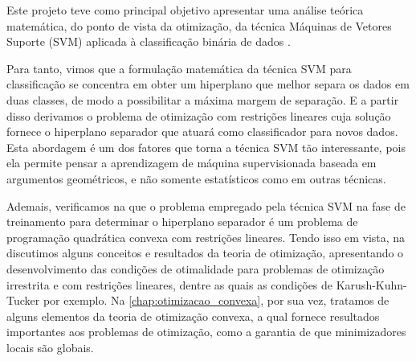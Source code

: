 \documentclass[12pt,a4paper]{scrartcl}
\theoremstyle{definition}%
\begin{document}
Este projeto teve como principal objetivo apresentar uma análise teórica matemática, do ponto de vista da otimização, da técnica Máquinas de Vetores Suporte (SVM) aplicada à classificação binária de dados \cite{Evelin2017,Faisal2019}. 




Para tanto, vimos que a formulação matemática da técnica SVM para classificação se concentra em obter um hiperplano que melhor separa os dados em duas classes, de modo a possibilitar a máxima margem de separação. E a partir disso derivamos o problema de otimização com restrições lineares cuja solução fornece o hiperplano separador que atuará como classificador para novos dados. Esta abordagem é um dos fatores que torna a técnica SVM tão interessante, pois ela permite pensar a aprendizagem de máquina supervisionada baseada em argumentos geométricos, e não somente estatísticos como em outras técnicas.

Ademais, verificamos na  que o problema empregado pela técnica SVM na fase de treinamento para determinar o hiperplano separador é um problema de programação quadrática convexa com restrições lineares. Tendo isso em vista, na  discutimos alguns conceitos e resultados da teoria de otimização, apresentando o desenvolvimento das condições de otimalidade para problemas de otimização irrestrita e com restrições lineares, dentre as quais as condições de Karush-Kuhn-Tucker por exemplo. Na \cref{chap:otimizacao_convexa}, por sua vez, tratamos de alguns elementos da teoria de otimização convexa, a qual fornece resultados importantes aos problemas de otimização, como a garantia de que minimizadores locais são globais. 
\end{document}
